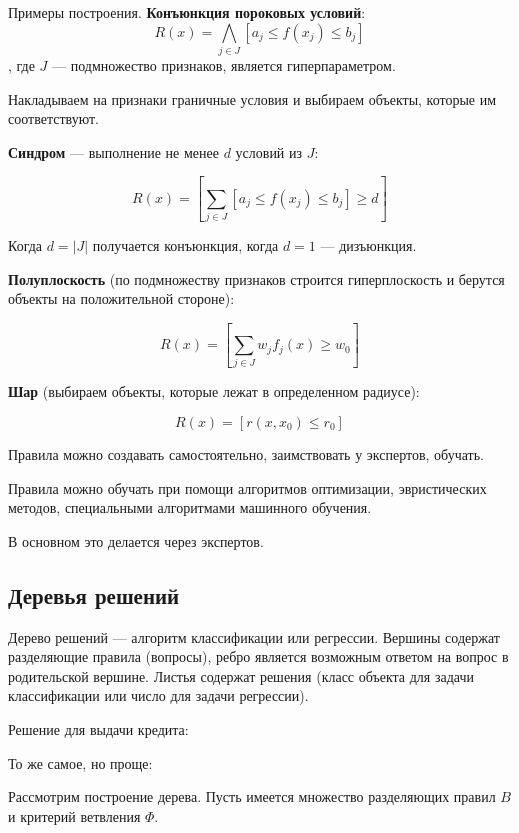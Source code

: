 Примеры построения. \textbf{Конъюнкция пороковых условий}:
\[
    R(x) = \bigwedge_{j \in J} [a_j \leq f(x_j) \leq b_j]
\], где $J$ --- подмножество признаков, является гиперпараметром.

Накладываем на признаки граничные условия и выбираем объекты, которые им
соответствуют.

\textbf{Синдром} --- выполнение не менее $d$ условий из $J$:

\[
    R(x) = \left[ \sum_{j\in J} \left[ a_j \leq f(x_j) \leq b_j  \right] \geq d \right]
\]

Когда $d = |J|$ получается конъюнкция, когда $d = 1$ --- дизъюнкция.

\textbf{Полуплоскость} (по подмножеству признаков строится гиперплоскость и
берутся объекты на положительной стороне):

\[
    R(x) = \left[ \sum_{j \in J} w_j f_j(x) \geq w_0 \right]
\]

\textbf{Шар} (выбираем объекты, которые лежат в определенном радиусе):

\[
    R(x) = [ r(x, x_0) \leq r_0 ]
\]

Правила можно создавать самостоятельно, заимствовать у экспертов, обучать.

Правила можно обучать при помощи алгоритмов оптимизации, эвристических методов,
специальными алгоритмами машинного обучения.

В основном это делается через экспертов.

\subsection{Деревья решений}

Дерево решений --- алгоритм классификации или регрессии. Вершины содержат
разделяющие правила (вопросы), ребро является возможным ответом на вопрос в
родительской вершине. Листья содержат решения (класс объекта для задачи
классификации или число для задачи регрессии).

Решение для выдачи кредита:


То же самое, но проще:


Рассмотрим построение дерева. Пусть имеется множество разделяющих правил $B$ и
критерий ветвления $\Phi$.

